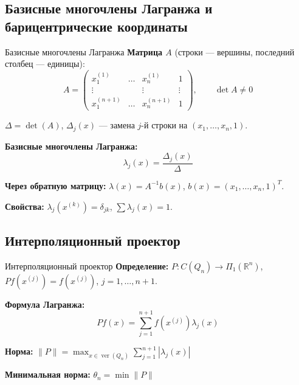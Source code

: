 \documentclass{beamer}
\begin{document}
\subsection{Базисные многочлены Лагранжа и барицентрические координаты}
\begin{frame}{Базисные многочлены Лагранжа}
    \textbf{Матрица $A$} (строки — вершины, последний столбец — единицы):
    \[
    A = \begin{pmatrix}
    x_1^{(1)} & \dots & x_n^{(1)} & 1 \\
    \vdots & & \vdots & \vdots \\
    x_1^{(n+1)} & \dots & x_n^{(n+1)} & 1
    \end{pmatrix}, \qquad \det A \neq 0
    \]

    \vspace{0.3cm}

    $\Delta = \det(A)$, $\Delta_j(x)$ — замена $j$-й строки на $(x_1,\dots,x_n,1)$.

    \vspace{0.3cm}

    \textbf{Базисные многочлены Лагранжа:}
    \[
    \lambda_j(x) = \frac{\Delta_j(x)}{\Delta}
    \]

    \vspace{0.3cm}

    \textbf{Через обратную матрицу:} $\lambda(x) = A^{-1} b(x)$, $b(x) = (x_1,\dots,x_n,1)^T$.

    \vspace{0.3cm}

    \textbf{Свойства:} $\lambda_j(x^{(k)}) = \delta_{jk}$, $\sum \lambda_j(x) = 1$.
\end{frame}
\subsection{Интерполяционный проектор}
\begin{frame}{Интерполяционный проектор}
    \textbf{Определение:} $P: C(Q_n) \to \Pi_1(\mathbb{R}^n)$, $P f(x^{(j)}) = f(x^{(j)})$, $j=1,\dots,n+1$.

    \vspace{0.2cm}

    \textbf{Формула Лагранжа:}
    \[
    P f(x) = \sum_{j=1}^{n+1} f(x^{(j)}) \lambda_j(x)
    \]

    \vspace{0.2cm}

    \textbf{Норма:} $\displaystyle \|P\| = \max_{x \in \operatorname{ver}(Q_n)} \sum_{j=1}^{n+1} |\lambda_j(x)|$

    \vspace{0.2cm}

    \textbf{Минимальная норма:} $\theta_n = \min \|P\|$
\end{frame}
\end{document}
